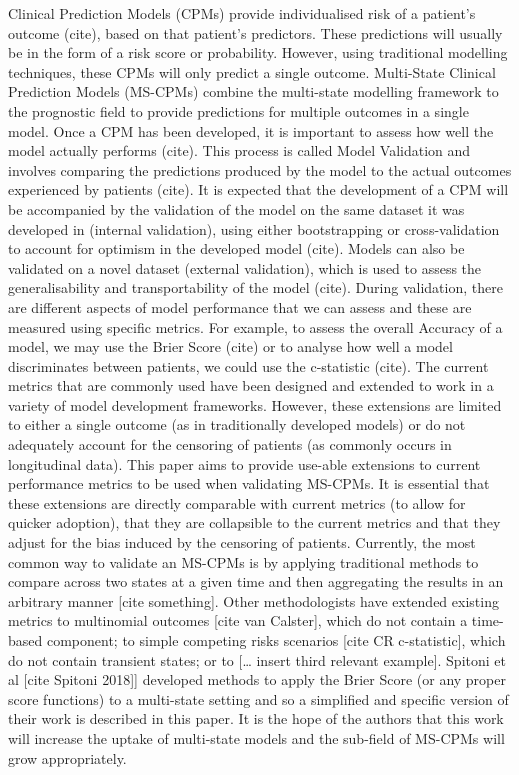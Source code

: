 \documentclass[12pt,PhD,twoside,openright]{muthesis}
\begin{document}
Clinical Prediction Models (CPMs) provide individualised risk of a patient's outcome (cite), based on that patient's predictors. These predictions will usually be in the form of a risk score or probability. However, using traditional modelling techniques, these CPMs will only predict a single outcome. Multi-State Clinical Prediction Models (MS-CPMs) combine the multi-state modelling framework to the prognostic field to provide predictions for multiple outcomes in a single model.
Once a CPM has been developed, it is important to assess how well the model actually performs (cite). This process is called Model Validation and involves comparing the predictions produced by the model to the actual outcomes experienced by patients (cite). It is expected that the development of a CPM will be accompanied by the validation of the model on the same dataset it was developed in (internal validation), using either bootstrapping or cross-validation to account for optimism in the developed model (cite). Models can also be validated on a novel dataset (external validation), which is used to assess the generalisability and transportability of the model (cite).
During validation, there are different aspects of model performance that we can assess and these are measured using specific metrics. For example, to assess the overall Accuracy of a model, we may use the Brier Score (cite) or to analyse how well a model discriminates between patients, we could use the c-statistic (cite). The current metrics that are commonly used have been designed and extended to work in a variety of model development frameworks. However, these extensions are limited to either a single outcome (as in traditionally developed models) or do not adequately account for the censoring of patients (as commonly occurs in longitudinal data).
This paper aims to provide use-able extensions to current performance metrics to be used when validating MS-CPMs. It is essential that these extensions are directly comparable with current metrics (to allow for quicker adoption), that they are collapsible to the current metrics and that they adjust for the bias induced by the censoring of patients.
Currently, the most common way to validate an MS-CPMs is by applying traditional methods to compare across two states at a given time and then aggregating the results in an arbitrary manner {[}cite something{]}. Other methodologists have extended existing metrics to multinomial outcomes {[}cite van Calster{]}, which do not contain a time-based component; to simple competing risks scenarios {[}cite CR c-statistic{]}, which do not contain transient states; or to {[}\ldots{} insert third relevant example{]}. Spitoni et al {[}cite Spitoni 2018{]}{]} developed methods to apply the Brier Score (or any proper score functions) to a multi-state setting and so a simplified and specific version of their work is described in this paper.
It is the hope of the authors that this work will increase the uptake of multi-state models and the sub-field of MS-CPMs will grow appropriately.
\end{document}
